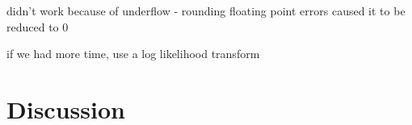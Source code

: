 \documentclass{article}
\begin{document}
didn't work because of underflow - rounding floating point errors caused it to be reduced to 0

if we had more time, use a log likelihood transform 

\section{Discussion}


% 
% 
% 



% 
\end{document}

